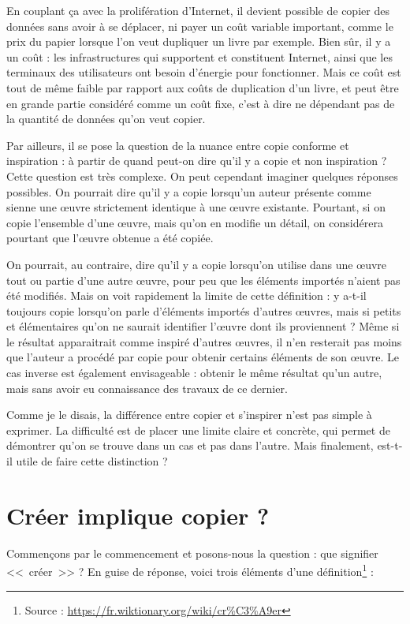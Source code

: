 En couplant ça avec la prolifération d'Internet, il devient possible de copier des données sans avoir à se déplacer, ni payer un coût variable important, comme le prix du papier lorsque l'on veut dupliquer un livre par exemple.
Bien sûr, il y a un coût : les infrastructures qui supportent et constituent Internet, ainsi que les terminaux des utilisateurs ont besoin d'énergie pour fonctionner.
Mais ce coût est tout de même faible par rapport aux coûts de duplication d'un livre, et peut être en grande partie considéré comme un coût fixe, c'est à dire ne dépendant pas de la quantité de données qu'on veut copier.

Par ailleurs, il se pose la question de la nuance entre copie conforme et inspiration : à partir de quand peut-on dire qu'il y a copie et non inspiration ?
Cette question est très complexe.
On peut cependant imaginer quelques réponses possibles.
On pourrait dire qu'il y a copie lorsqu'un auteur présente comme sienne une œuvre strictement identique à une œuvre existante.
Pourtant, si on copie l'ensemble d'une œuvre, mais qu'on en modifie un détail, on considérera pourtant 	que l'œuvre obtenue a été copiée.

On pourrait, au contraire, dire qu'il y a copie lorsqu'on utilise dans une œuvre tout ou partie d'une autre œuvre, pour peu que les éléments importés n'aient pas été modifiés.
Mais on voit rapidement la limite de cette définition : y a-t-il toujours copie lorsqu'on parle d'éléments importés d'autres œuvres, mais si petits et élémentaires qu'on ne saurait identifier l'œuvre dont ils proviennent ?
Même si le résultat apparaitrait comme inspiré d'autres œuvres, il n'en resterait pas moins que l'auteur a procédé par copie pour obtenir certains éléments de son œuvre.
Le cas inverse est également envisageable : obtenir le même résultat qu'un autre, mais sans avoir eu connaissance des travaux de ce dernier.

Comme je le disais, la différence entre copier et s'inspirer n'est pas simple à exprimer.
La difficulté est de placer une limite claire et concrète, qui permet de démontrer qu'on se trouve dans un cas et pas dans l'autre.
Mais finalement, est-t-il utile de faire cette distinction ?

\section{Créer implique copier ?}
Commençons par le commencement et posons-nous la question : que signifier <<~créer~>> ?
En guise de réponse, voici trois éléments d'une définition\footnote{Source : \url{https://fr.wiktionary.org/wiki/cr\%C3\%A9er}} :

